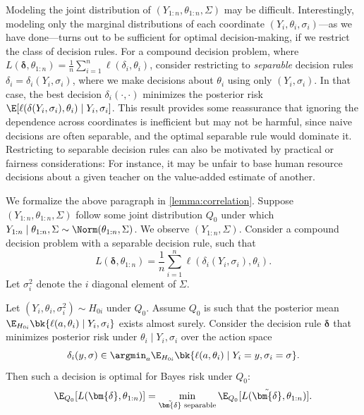 \documentclass[12pt, reqno]{amsart}
\newcommand{\bdelta}{\bm{\delta}}
\numberwithin{equation}{section}
\begin{document}
\begin{refsection}
\begin{appendices}
Modeling the joint distribution of $(Y_{1:n}, \theta_{1:n}, \Sigma)$ may be difficult.
Interestingly, modeling only the marginal distributions of each coordinate $ (Y_i,
\theta_i, \sigma_i)$---as we have done---turns out to be sufficient for optimal
decision-making, if we restrict the class of decision rules. 
For a compound decision
problem, where $L (\bdelta, \theta_{1:n}) = \frac {1}{n} \sum_{i=1}^n \ell(\delta_i,
\theta_i)$, consider restricting to \emph{separable} decision rules $\delta_i =
\delta_i(Y_i, \sigma_i)$, where we make decisions about $\theta_i$ using only $(Y_i,
\sigma_i)$. In that case, the best decision $\delta_i(\cdot, \cdot)$ minimizes the
posterior risk $\E[\ell(\delta(Y_i, \sigma_i),
\theta_i) \mid Y_i, \sigma_i]$. This result provides some reassurance that ignoring the
 dependence across coordinates is inefficient but may not be harmful, since naive
 decisions are often separable, and the optimal separable rule would dominate it.
 Restricting to separable decision rules can also be motivated by practical or fairness
 considerations: For instance, it may be unfair to base human resource decisions about a
 given teacher on the value-added estimate of another. 


We formalize the above paragraph in \cref{lemma:correlation}. Suppose $(Y_ {1:n},
\theta_{1:n},
\Sigma)$ follow some joint distribution $Q_0$ under which
$Y_{1:n} \mid \theta_{1:n}, \Sigma \sim \Norm(\theta_{1:n}, \Sigma)$. We observe $(Y_
{1:n}, \Sigma)$. Consider a compound decision problem with a separable decision rule,
such that \[
L(\bdelta, \theta_{1:n}) = \frac{1}{n} \sum_{i=1}^n \ell(\delta_i(Y_i, \sigma_i),
\theta_i).
\]
Let $\sigma_i^2$ denote the $i$\th{} diagonal element of $\Sigma$. 

\begin{lemma}
\label{lemma:correlation}
Let $(Y_i, \theta_i, \sigma_i^2) \sim H_{0i}$ under $Q_0$. Assume $Q_0$ is such that the
posterior mean
$\E_{H_{0i}} \bk{
  \ell(a, \theta_i) \mid Y_i, \sigma_i 
}$ exists almost surely. 
Consider the decision rule $\bdelta$ that minimizes posterior risk under $\theta_i
\mid Y_i, \sigma_i$ over the action space\[
\delta_i(y, \sigma) \in \argmin_a \E_{H_{0i}} \bk{
  \ell(a, \theta_i) \mid Y_i = y, \sigma_i = \sigma
}.
\]
Then such a decision is optimal for Bayes risk under $Q_0$:\[
\E_{Q_0}[L(\bdelta, \theta_{1:n})] = \min_{\tilde {\bdelta} \text{ separable}} \E_{Q_0}[L
(\tilde {\bdelta}, \theta_{1:n})]. 
\]
\end{lemma}


\end{appendices}
\end{refsection}
\end{document}
